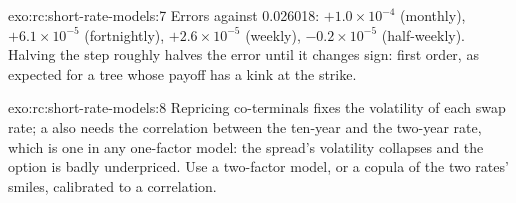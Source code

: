 \begin{solution}{exo:rc:short-rate-models:7}
Errors against 0.026018: $+1.0\times10^{-4}$ (monthly), $+6.1\times10^{-5}$
(fortnightly), $+2.6\times10^{-5}$ (weekly), $-0.2\times10^{-5}$ (half-weekly). Halving
the step roughly halves the error until it changes sign: first order, as
expected for a tree whose payoff has a kink at the strike.
\end{solution}

\begin{solution}{exo:rc:short-rate-models:8}
Repricing co-terminals fixes the volatility of each swap rate; a  also needs the correlation between the ten-year and the two-year rate,
which is one in any one-factor model: the spread's volatility collapses and
the option is badly underpriced. Use a two-factor model, or a copula of the
two rates' smiles, calibrated to a correlation.
\end{solution}

